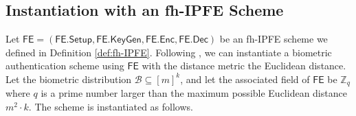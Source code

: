 \fi


\subsection{Instantiation with an fh-IPFE Scheme}
\label{sec:fh-IPFE-instantiation}

Let $\textsf{FE} = (\textsf{FE.Setup}, \textsf{FE.KeyGen}, \textsf{FE.Enc}, \textsf{FE.Dec})$ be an fh-IPFE scheme we defined in Definition \ref{def:fh-IPFE}. Following \cite{cryptoeprint:2023/481}, we can instantiate a biometric authentication scheme using $\textsf{FE}$ with the distance metric the Euclidean distance. Let the biometric distribution $\mathcal{B} \subseteq [m]^k$, and let the associated field of $\textsf{FE}$ be $\mathbb{Z}_q$ where $q$ is a prime number larger than the maximum possible Euclidean distance $m^2 \cdot k$. The scheme is instantiated as follows.

